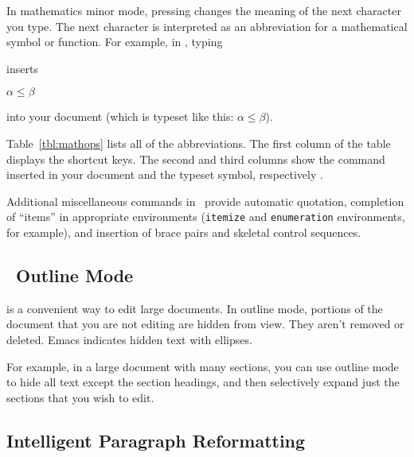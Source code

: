 In mathematics minor mode, pressing  changes the meaning of the
next character you type.  The next character is interpreted as an
abbreviation for a mathematical symbol or function.
For example, in \auctex, typing

\begin{exindent}
  \key{\ttdollar}  \key{\tttilde}   
  \key{<}   \key{\ttdollar}
\end{exindent}

inserts

\begin{shortexample}
$\alpha \leq \beta$
\end{shortexample}

into your document (which is typeset like this: $\alpha\leq\beta$).

Table~\ref{tbl:mathops} lists all of the abbreviations.
The first column of the table displays the shortcut keys.
The second and third columns show the command inserted in your
document and the typeset symbol, respectively%
.

\pagebreak


Additional miscellaneous commands in \auctex\ provide automatic 
quotation, completion of ``items'' in appropriate environments (\verb|itemize|
and \verb|enumeration| environments, for example),
and insertion of brace pairs and 
skeletal control sequences.

\subsection{\protect\auctex\ Outline Mode}

 is a 
convenient way to edit large documents.  In outline
mode, portions of the document that you are not editing are hidden
from view.  They aren't removed or deleted.  Emacs indicates hidden text with ellipses.

For example, in a large document with many sections, you can use
outline mode to hide all text except the section headings, and then
selectively expand just the sections that you wish to edit.

\subsection{Intelligent Paragraph Reformatting}

